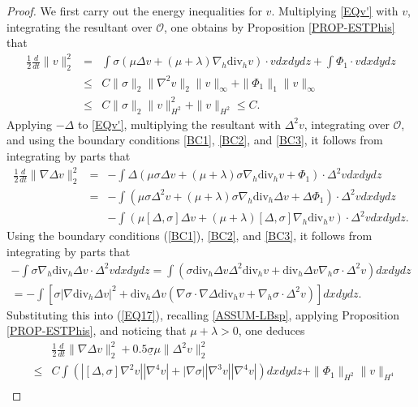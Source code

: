 \documentclass[10pt,a4paper]{amsart}
\begin{document}
\begin{proof}
We first carry out the energy inequalities for $v$. Multiplying \eqref{EQv'} with $v$, integrating the resultant over $\mathcal O$, one obtains by Proposition \ref{PROP-ESTPhis} that
\begin{eqnarray}
  \frac12\frac{d}{dt}\|v\|_2^2&=&\int\sigma(\mu\Delta v+(\mu+\lambda)\nabla_h\text{div}_hv)\cdot vdxdydz+\int\Phi_1\cdot vdxdydz \nonumber\\
  &\leq& C\|\sigma\|_2\|\nabla^2v\|_2\|v\|_\infty+\|\Phi_1\|_1\|v\|_\infty\nonumber\\
  &\leq& C\|\sigma\|_{2}\|v\|_{H^2}^2+\|v\|_{H^2}\leq C.\label{EQ16}
\end{eqnarray}
Applying $-\Delta$ to \eqref{EQv'}, multiplying the resultant with $\Delta^2v$, integrating over $\mathcal O$, and using the boundary
conditions \eqref{BC1}, \eqref{BC2}, and \eqref{BC3}, it follows from integrating by parts that
\begin{eqnarray}
  \frac12\frac{d}{dt}\|\nabla\Delta v\|_2^2
  &=&-\int\Delta(\mu\sigma\Delta v+(\mu+\lambda)\sigma\nabla_h\text{div}_hv+\Phi_1)\cdot\Delta^2vdxdydz\nonumber\\
  &=&-\int(\mu\sigma\Delta^2v+(\mu+\lambda)\sigma\nabla_h\text{div}_h\Delta v+\Delta\Phi_1)\cdot\Delta^2vdxdydz\nonumber\\
  &&-\int(\mu[\Delta,\sigma]\Delta v+(\mu+\lambda)[\Delta,\sigma]\nabla_h\text{div}_hv)\cdot\Delta^2v dxdydz. \label{EQ17}
\end{eqnarray}
Using the boundary conditions (\ref{BC1}), \eqref{BC2}, and \eqref{BC3}, it follows from integrating by parts that
\begin{eqnarray*}
  -\int\sigma\nabla_h\text{div}_h\Delta v\cdot\Delta^2vdxdydz
  =\int(\sigma\text{div}_h\Delta v\Delta^2\text{div}_hv+\text{div}_h\Delta v\nabla_h\sigma\cdot\Delta^2v)dxdydz\\
  =-\int[\sigma|\nabla\text{div}_h\Delta v|^2+\text{div}_h\Delta v(\nabla\sigma\cdot\nabla\Delta\text{div}_hv+\nabla_h\sigma\cdot\Delta^2v)]dxdydz.
\end{eqnarray*}
Substituting this into (\ref{EQ17}), recalling \eqref{ASSUM-LBsp}, applying Proposition \ref{PROP-ESTPhis}, and noticing that $\mu+\lambda>0$,
one deduces
\begin{eqnarray}
  &&\frac12\frac{d}{dt}\|\nabla\Delta v\|_2^2+0.5\underline\sigma \mu\|\Delta^2v\|_2^2\nonumber \\
  &\leq& C\int(|[\Delta,\sigma]\nabla^2v||\nabla^4v|+|\nabla\sigma||\nabla^3v||\nabla^4v|)dxdydz+ \|\Phi_1\|_{H^2}\|v\|_{H^4}\nonumber\\

\end{eqnarray}
\end{proof}
\end{document}
